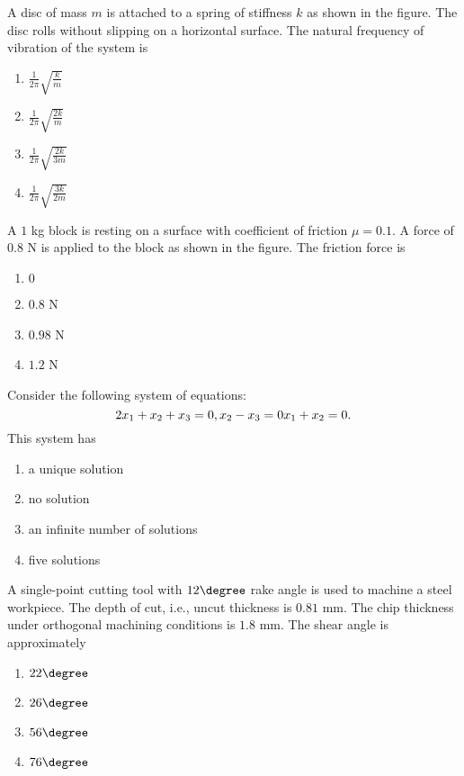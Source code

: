     \item A disc of mass $m$ is attached to a spring of stiffness $k$ as shown in the figure. The disc rolls without slipping on a horizontal surface. The natural frequency of vibration of the system is

    
    \begin{enumerate}
        \item $\frac{1}{2\pi} \sqrt{\frac{k}{m}}$
        \item $\frac{1}{2\pi} \sqrt{\frac{2k}{m}}$
        \item $\frac{1}{2\pi} \sqrt{\frac{2k}{3m}}$
        \item $\frac{1}{2\pi} \sqrt{\frac{3k}{2m}}$
    \end{enumerate}


    \item A $1$ kg block is resting on a surface with coefficient of friction $\mu= 0.1$. A force of $0.8$ N is applied to the block as shown in the figure. The friction force is
    
    \begin{enumerate}
        \item $0$
        \item $0.8$ N
        \item $0.98$ N
        \item $1.2$ N
    \end{enumerate}

    \item Consider the following system of equations:
    $$
    2x_1 + x_2 + x_3 = 0\\,
    x_2-x_3 = 0\\
 x_1 + x_2 = 0.
    $$
    This system has
    \begin{enumerate}
        \item a unique solution
        \item no solution
        \item an infinite number of solutions
        \item five solutions
    \end{enumerate}


    \item A single-point cutting tool with $12\degree$ rake angle is used to machine a steel workpiece. The depth of cut, i.e., uncut thickness is $0.81$ mm. The chip thickness under orthogonal machining conditions is $1.8$ mm. The shear angle is approximately
    \begin{enumerate}
        \item $22\degree$
        \item $26\degree$
        \item $56\degree$
        \item $76\degree$
    \end{enumerate}

